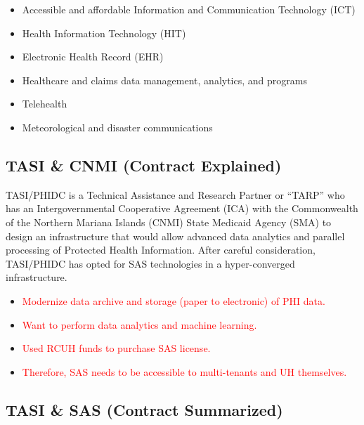 \begin{itemize}
    \item Accessible and affordable Information and Communication Technology (ICT)
    \item Health Information Technology (HIT)
    \item Electronic Health Record (EHR)
    \item Healthcare and claims data management, analytics, and programs
    \item Telehealth
    \item Meteorological and disaster communications
\end{itemize}

\subsection{TASI \& CNMI (Contract Explained)}
TASI/PHIDC is a Technical Assistance and Research Partner or “TARP” who has an Intergovernmental Cooperative Agreement (ICA) with the Commonwealth of the Northern Mariana Islands (CNMI) State Medicaid Agency (SMA) to design an infrastructure that would allow advanced data analytics and parallel processing of Protected Health Information. After careful consideration, TASI/PHIDC has opted for SAS technologies in a hyper-converged infrastructure.

\begin{itemize}
    \item \textcolor{red}{Modernize data archive and storage (paper to electronic) of PHI data.}
    \item \textcolor{red}{Want to perform data analytics and machine learning.}
    \item \textcolor{red}{Used RCUH funds to purchase SAS license.}
    \item \textcolor{red}{Therefore, SAS needs to be accessible to multi-tenants and UH themselves.}
\end{itemize}

\subsection{TASI \& SAS (Contract Summarized)}

